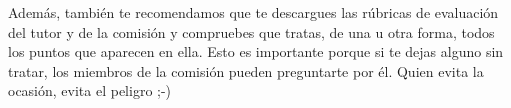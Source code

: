 Además, también te recomendamos que te descargues las rúbricas de evaluación del tutor y de la comisión y compruebes que tratas, de una u otra forma, todos los puntos que aparecen en ella. Esto es importante porque si te dejas alguno sin tratar, los miembros de la comisión pueden preguntarte por él. Quien evita la ocasión, evita el peligro ;-)